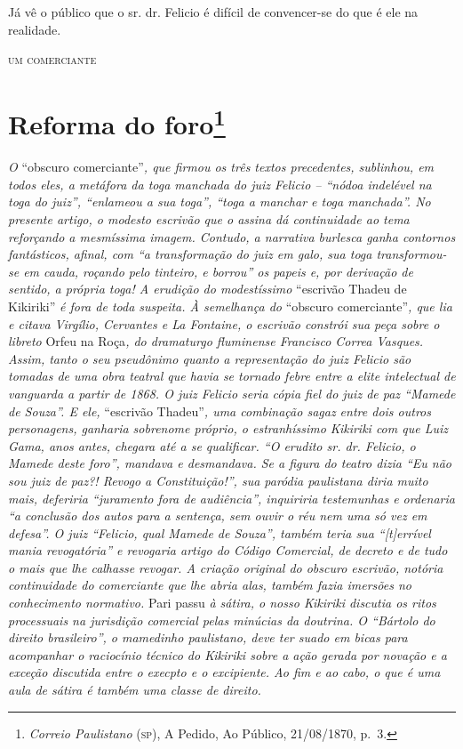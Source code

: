 Já vê o público que o sr. dr. Felicio é difícil de convencer-se do que é
ele na realidade.

\begin{flushright}
\textsc{um comerciante}
\end{flushright}

\chapter{Reforma do foro\footnote{\emph{Correio Paulistano} (\textsc{sp}), A Pedido, Ao Público,
  21/08/1870, p.~3.}} %

\begin{didascalia}
\emph{O} ``obscuro comerciante''\emph{, que firmou os três textos
precedentes, sublinhou, em todos eles, a metáfora da toga manchada do
juiz Felicio -- ``nódoa indelével na toga do juiz'', ``enlameou a sua
toga'', ``toga a manchar e toga manchada''. No presente artigo, o modesto
escrivão que o assina dá continuidade ao tema reforçando a mesmíssima
imagem. Contudo, a narrativa burlesca ganha contornos fantásticos,
afinal, com ``a transformação do juiz em galo, sua toga transformou-se em
cauda, roçando pelo tinteiro, e borrou'' os papeis e, por derivação de
sentido, a própria toga! A erudição do modestíssimo} ``escrivão Thadeu de
Kikiriki'' \emph{é fora de toda suspeita. À semelhança do} ``obscuro
comerciante''\emph{, que lia e citava Virgílio, Cervantes e La Fontaine,
o escrivão constrói sua peça sobre o libreto} Orfeu na Roça\emph{, do
dramaturgo fluminense Francisco Correa Vasques. Assim, tanto o seu
pseudônimo quanto a representação do juiz Felicio são tomadas de uma
obra teatral que havia se tornado febre entre a elite intelectual de
vanguarda a partir de 1868. O juiz Felicio seria cópia fiel do juiz de
paz ``Mamede de Souza''. E ele,} ``escrivão Thadeu''\emph{, uma combinação
sagaz entre dois outros personagens, ganharia sobrenome próprio, o
estranhíssimo Kikiriki com que Luiz Gama, anos antes, chegara até a se
qualificar. ``O erudito sr. dr. Felicio, o Mamede deste foro'', mandava e
desmandava. Se a figura do teatro dizia ``Eu não sou juiz de paz?! Revogo
a Constituição!'', sua paródia paulistana diria muito mais, deferiria
``juramento fora de audiência'', inquiriria testemunhas e ordenaria ``a
conclusão dos autos para a sentença, sem ouvir o réu nem uma só vez em
defesa''. O juiz ``Felicio, qual Mamede de Souza'', também teria sua
``{[}t{]}errível mania revogatória'' e revogaria artigo do Código
Comercial, de decreto e de tudo o mais que lhe calhasse revogar. A
criação original do obscuro escrivão, notória continuidade do
comerciante que lhe abria alas, também fazia imersões no conhecimento
normativo.} Pari passu \emph{à sátira, o nosso Kikiriki discutia os
ritos processuais na jurisdição comercial pelas minúcias da doutrina. O
``Bártolo do direito brasileiro'', o mamedinho paulistano, deve ter suado
em bicas para acompanhar o raciocínio técnico do Kikiriki sobre a ação
gerada por novação e a exceção discutida entre o execpto e o excipiente.
Ao fim e ao cabo, o que é uma aula de sátira é também uma classe de
direito.}
\end{didascalia}

